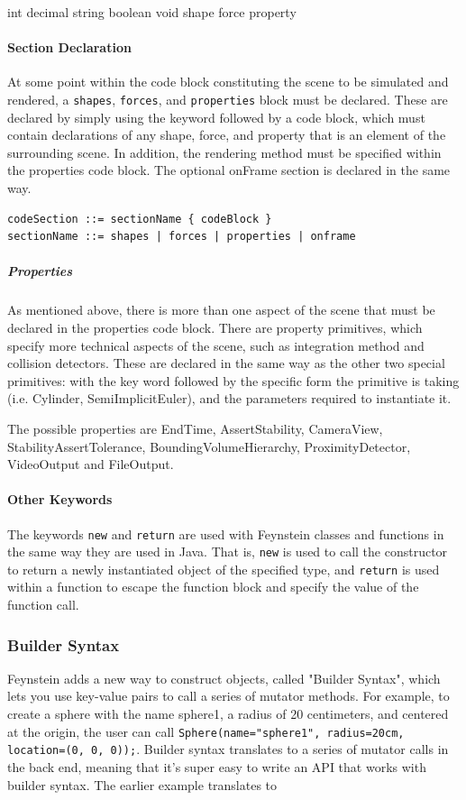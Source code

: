 int decimal string boolean void shape force property

\paragraph{Section Declaration}

At some point within the code block constituting the scene to be
simulated and rendered, a \texttt{shapes}, \texttt{forces}, and \texttt{properties} block
must be declared.  These are declared by simply using the keyword
followed by a code block, which must contain declarations of any
shape, force, and property that is an element of the surrounding
scene.  In addition, the rendering method must be specified within the
properties code block.  The optional onFrame section is declared in
the same way.

\begin{verbatim}
codeSection ::= sectionName { codeBlock }
sectionName ::= shapes | forces | properties | onframe
\end{verbatim}

\subparagraph{Properties}

As mentioned above, there is more than one aspect of the scene that
must be declared in the properties code block.  There are property
primitives, which specify more technical aspects of the scene, such as
integration method and collision detectors.  These are declared in the
same way as the other two special primitives: with the key word
followed by the specific form the primitive is taking (i.e. Cylinder,
SemiImplicitEuler), and the parameters required to instantiate it.

The possible properties are EndTime, AssertStability, CameraView,
StabilityAssertTolerance, BoundingVolumeHierarchy, ProximityDetector,
VideoOutput and FileOutput.

\paragraph{Other Keywords}

The keywords \texttt{new} and \texttt{return} are used with Feynstein
classes and functions in the same way they are used in Java.  That is,
\texttt{new} is used to call the constructor to return a newly
instantiated object of the specified type, and \texttt{return} is used
within a function to escape the function block and specify the value
of the function call.

\subsubsection{Builder Syntax}
Feynstein adds a new way to construct objects, called "Builder
Syntax", which lets you use key-value pairs to call a series of
mutator methods. For example, to create a sphere with the name
sphere1, a radius of 20 centimeters, and centered at the origin, the
user can call \texttt{Sphere(name="sphere1", radius=20cm, location=(0, 0,
0));}. Builder syntax translates to a series of mutator calls in the
back end, meaning that it's super easy to write an API that works with
builder syntax. The earlier example translates to 

